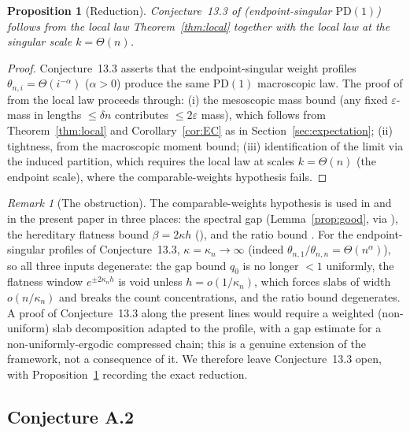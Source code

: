 \documentclass[11pt]{article}
\newcommand{\1}{\mathbf{1}}
\newcommand{\eps}{\varepsilon}
\newcommand{\PD}{\mathrm{PD}}
\newtheorem{proposition}[theorem]{Proposition}
\theoremstyle{remark}
\newtheorem{remark}[theorem]{Remark}
\begin{document}
\begin{proposition}[Reduction]\label{prop:133}
Conjecture~13.3 of \cite[Section~13]{Lon26} (endpoint-singular
$\PD(1)$) follows from the local law Theorem~\ref{thm:local} together
with the local law at the singular scale $k=\Theta(n)$.
\end{proposition}

\begin{proof}
Conjecture~13.3 asserts that the endpoint-singular weight profiles
$\theta_{n,i}=\Theta(i^{-\alpha})$ ($\alpha>0$) produce the same
$\PD(1)$ macroscopic law. The proof of \cite[Theorem~6.1]{Lon26} from
the local law proceeds through: (i) the mesoscopic mass bound (any
fixed $\eps$-mass in lengths $\le\delta n$ contributes $\le2\eps$
mass), which follows from Theorem~\ref{thm:local} and
Corollary~\ref{cor:EC} as in Section~\ref{sec:expectation}; (ii)
tightness, from the macroscopic moment bound; (iii) identification of
the limit via the induced partition, which requires the local law at
scales $k=\Theta(n)$ (the endpoint scale), where the comparable-weights
hypothesis \cite[eq.~(2.1)]{Lon26} fails.
\end{proof}

\begin{remark}[The obstruction]\label{rem:obstruction}
The comparable-weights hypothesis is used in \cite{Lon26} and in the
present paper in three places: the spectral gap
(Lemma~\ref{prop:good}, via \cite[Lemmas~6.2--6.3]{Lon26}), the
hereditary flatness bound $\beta=2\kappa h$
(\cite[Lemmas~6.5--6.6]{Lon26}), and the ratio bound
\cite[eq.~(6.4)]{Lon26}. For the endpoint-singular profiles of
Conjecture~13.3, $\kappa=\kappa_n\to\infty$ (indeed
$\theta_{n,1}/\theta_{n,n}=\Theta(n^{\alpha})$), so all three inputs
degenerate: the gap bound $q_0$ is no longer $<1$ uniformly, the
flatness window $e^{\pm2\kappa_nh}$ is void unless
$h=o(1/\kappa_n)$, which forces slabs of width $o(n/\kappa_n)$ and
breaks the count concentrations, and the ratio bound degenerates.
A proof of Conjecture~13.3 along the present lines would require a
weighted (non-uniform) slab decomposition adapted to the profile, with
a gap estimate for a non-uniformly-ergodic compressed chain; this is a
genuine extension of the framework, not a consequence of it. We
therefore leave Conjecture~13.3 open, with
Proposition~\ref{prop:133} recording the exact reduction.
\end{remark}

\subsection{Conjecture A.2}\label{sec:A2}
\end{document}
